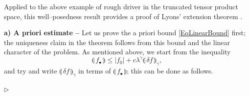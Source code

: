 \documentclass[11pt,a4paper]{amsart}
\renewcommand{\leq}{\leqslant}
\numberwithin{equation}{section} %
\newenvironment{Dem}{%
    \begin{list}{\hspace{0.5cm}{\sc Proof --}}{%
        \setlength{\topsep}{0pt}%
        \setlength{\leftmargin}{0pt}%
        \setlength{\rightmargin}{0pt}%
        \setlength{\listparindent}{0pt}%
        \setlength{\itemindent}{0pt}%
        \setlength{\parsep}{0pt}%
        \addtolength{\leftmargin}{20pt}%
        \addtolength{\rightmargin}{0pt}%
    } \item }{\hfill{\space $\rhd$}\end{list}\smallskip}
\begin{document}
\medskip

Applied to the above example of rough driver in the truncated tensor product space, this well--posedness result provides a proof of Lyons' extension theorem \cite{Lyons98}.

\medskip

\begin{Dem}
{\bf a) A priori estimate --} Let us prove the a priori bound \eqref{EqLinearBound} first; the uniqueness claim in the theorem follows from this bound and the linear character of the problem. As mentioned above, we start from the inequality
$$
\llparenthesis\,f_\bullet \,\rrparenthesis \leq | f_0 | + c \lambda^\gamma \llparenthesis\, \delta f \,\rrparenthesis _\gamma,
$$
and try and write $\llparenthesis\, \delta f \,\rrparenthesis _\gamma$ in terms of $\llparenthesis\,f_\bullet \,\rrparenthesis$; this can be done as follows.


\end{Dem}
\end{document}
